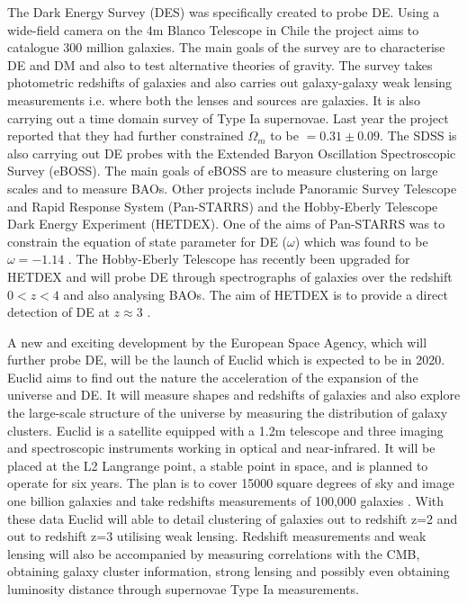 \documentclass[a4paper,12pt]{article}
\begin{document}
The Dark Energy Survey (DES) was specifically created to probe DE. Using a wide-field camera on the 4m Blanco Telescope in Chile the project aims to catalogue 300 million
galaxies. The main goals of the survey are to characterise DE and DM and also to test alternative theories of gravity. The survey takes photometric redshifts of galaxies and
also carries out galaxy-galaxy weak lensing measurements i.e. where both the lenses and sources are galaxies. It is also carrying out a time domain survey of Type Ia supernovae.
Last year the project reported that they had further constrained $\Omega_m$ to be $=0.31\pm0.09$. The SDSS is also carrying out DE probes with the Extended Baryon Oscillation
Spectroscopic Survey (eBOSS). The main goals of eBOSS are to measure clustering on large scales and to measure BAOs. Other projects include Panoramic Survey Telescope and Rapid 
Response System (Pan-STARRS) and the Hobby-Eberly Telescope Dark Energy Experiment (HETDEX). 
One of the aims of Pan-STARRS was to constrain the equation of state parameter for DE ($\omega$) which was found to be $\omega=-1.14$ \citep{zheng}. The Hobby-Eberly Telescope 
has recently been upgraded for HETDEX and will probe DE through spectrographs of galaxies over the redshift $0<z<4$ and also analysing BAOs. The aim of HETDEX is to provide a
direct detection of DE at $z\approx3$ \citep{hill}.

A new and exciting development by the European Space Agency, which will further probe DE, will be the launch of Euclid which is expected to be in 2020. Euclid aims to find out
the nature the acceleration of the expansion of the universe and DE. It will measure shapes and redshifts of galaxies and also explore the large-scale structure of the universe
by measuring the distribution of galaxy clusters. Euclid is a satellite equipped with a 1.2m telescope and three imaging and spectroscopic instruments working in optical and
near-infrared. It will be placed at the L2 Langrange point, a stable point in space, and is planned to operate for six years. The plan is to cover 15000 square degrees of sky and
image one billion galaxies and take redshifts measurements of 100,000 galaxies \citep{amendola}. With these data Euclid will able to detail clustering of galaxies out to redshift
z=2 and out to redshift z=3 utilising weak lensing. Redshift measurements and weak lensing will also be accompanied by measuring correlations with the CMB, obtaining galaxy cluster 
information, strong lensing and possibly even obtaining luminosity distance through supernovae Type Ia measurements.
\end{document}
